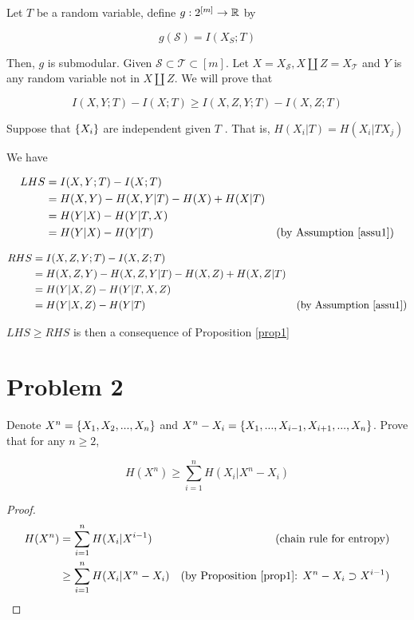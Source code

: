 \documentclass{article}
\begin{document}
\begin{longproof}
\begin{enumerate}
Let $T$ be a random variable, define $g: 2^{[m]} \to \mathbb{R}$ by

$$
    g(\mathcal{S}) = I(X_S; T)
$$

Then, $g$ is submodular. Given $\mathcal{S} \subset \mathcal{T} \subset [m]$. Let $X = X_\mathcal{S}, X \coprod Z = X_\mathcal{T}$ and $Y$ is any random variable not in $X \coprod Z$. We will prove that 

$$
    I(X, Y; T) - I(X; T) \geq I(X, Z, Y; T) - I(X, Z; T)
$$

\begin{assumption}
    \label{assu1}
    Suppose that $\{X_i\}$ are independent given $T$ . That is, $H(X_i | T) = H(X_i | T X_j)$
\end{assumption}

We have

\begin{align*}
     LHS
     &= I(X, Y; T) - I(X; T) \\
     &= H(X, Y) - H(X, Y | T) - H(X) + H(X | T) \\
     &= H(Y|X) - H(Y|T,X) \\
     &= H(Y|X) - H(Y|T) &\text{(by Assumption \ref{assu1})}
\end{align*}

\begin{align*}
     RHS
     &= I(X, Z, Y; T) - I(X, Z; T) \\
     &= H(X, Z, Y) - H(X, Z, Y | T) - H(X, Z) + H(X, Z | T) \\
     &= H(Y|X, Z) - H(Y|T,X,Z) \\
     &= H(Y|X, Z) - H(Y|T) &\text{(by Assumption \ref{assu1})}
\end{align*}

$LHS \geq RHS$ is then a consequence of Proposition \ref{prop1}


\end{enumerate}
\end{longproof}

\section{Problem 2}

Denote $X^n = \{X_1, X_2, ..., X_n\}$ and $X^n - X_i = \{X_1, ..., X_{i-1}, X_{i+1}, ..., X_n\}$. Prove that for any $n \geq 2$,

$$
    H(X^n) \geq \sum_{i=1}^n H(X_i | X^n - X_i)
$$

\begin{proof}

\begin{align*}
    H(X^n)
    &= \sum_{i=1}^n H(X_i | X^{i-1}) &\text{(chain rule for entropy)}\\
    &\geq \sum_{i=1}^n H(X_i | X^n - X_i) &\text{(by Proposition \ref{prop1}: $X^n - X_i \supset X^{i-1}$)}
\end{align*}
   
\end{proof}
\end{document}
